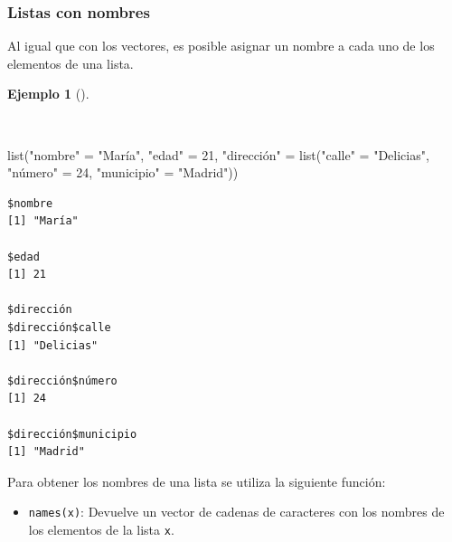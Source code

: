 \documentclass[
  a4paper,
]{scrreport}
\newenvironment{Shaded}{\begin{snugshade}}{\end{snugshade}}
\newcommand{\DecValTok}[1]{\textcolor[rgb]{0.68,0.00,0.00}{#1}}
\newcommand{\FunctionTok}[1]{\textcolor[rgb]{0.28,0.35,0.67}{#1}}
\newcommand{\NormalTok}[1]{\textcolor[rgb]{0.00,0.23,0.31}{#1}}
\newcommand{\OtherTok}[1]{\textcolor[rgb]{0.00,0.23,0.31}{#1}}
\newcommand{\StringTok}[1]{\textcolor[rgb]{0.13,0.47,0.30}{#1}}
\providecommand{\tightlist}{%
  \setlength{\itemsep}{0pt}\setlength{\parskip}{0pt}}\usepackage{longtable,booktabs,array}
\theoremstyle{definition}
\theoremstyle{definition}
\newtheorem{example}{Ejemplo}[chapter]
\theoremstyle{remark}
\begin{document}
\subsubsection{Listas con nombres}\label{listas-con-nombres}

Al igual que con los vectores, es posible asignar un nombre a cada uno
de los elementos de una lista.

\begin{example}[]\protect\hypertarget{exm-creacion-listas-nombres}{}\label{exm-creacion-listas-nombres}

~

\begin{Shaded}
\begin{Highlighting}[]
\FunctionTok{list}\NormalTok{(}\StringTok{"nombre"} \OtherTok{=} \StringTok{"María"}\NormalTok{, }\StringTok{"edad"} \OtherTok{=} \DecValTok{21}\NormalTok{, }\StringTok{"dirección"} \OtherTok{=} \FunctionTok{list}\NormalTok{(}\StringTok{"calle"} \OtherTok{=} \StringTok{"Delicias"}\NormalTok{, }\StringTok{"número"} \OtherTok{=} \DecValTok{24}\NormalTok{, }\StringTok{"municipio"} \OtherTok{=} \StringTok{"Madrid"}\NormalTok{))}
\end{Highlighting}
\end{Shaded}

\begin{verbatim}
$nombre
[1] "María"

$edad
[1] 21

$dirección
$dirección$calle
[1] "Delicias"

$dirección$número
[1] 24

$dirección$municipio
[1] "Madrid"
\end{verbatim}

\end{example}

Para obtener los nombres de una lista se utiliza la siguiente función:

\begin{itemize}
\tightlist
\item
  \texttt{names(x)}: Devuelve un vector de cadenas de caracteres con los
  nombres de los elementos de la lista \texttt{x}.
\end{itemize}
\end{document}
